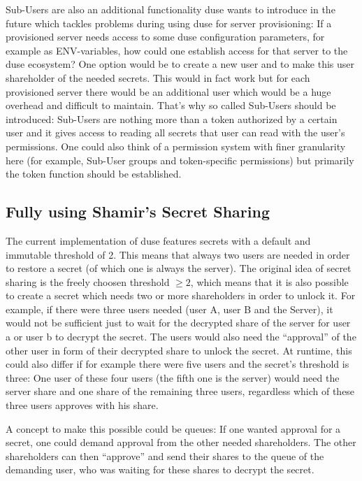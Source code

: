 Sub-Users are also an additional functionality duse wants to introduce in
the future which tackles problems during using duse for server provisioning:
If a provisioned server needs access to some duse configuration parameters,
for example as ENV-variables, how could one establish access for that server
to the duse ecosystem? One option would be to create a new user and to make
this user shareholder of the needed secrets. This would in fact work but for
each provisioned server there would be an additional user which would be a
huge overhead and difficult to maintain. That's why so called Sub-Users should
be introduced: Sub-Users are nothing more than a token authorized by a certain
user and it gives access to reading all secrets that user can read with the
user's permissions. One could also think of a permission system with finer
granularity here (for example, Sub-User groups and token-specific permissions)
but primarily the token function should be established.

\subsection{Fully using Shamir's Secret Sharing}

The current implementation of duse features secrets with a default and 
immutable threshold of 2. This means that always two users are needed in
order to restore a secret (of which one is always the server). The original
idea of secret sharing is the freely choosen threshold $\geq 2$, which
means that it is also possible to create a secret which needs two or more
shareholders in order to unlock it. For example, if there were three users
needed (user A, user B and the Server), it would not be sufficient just to
wait for the decrypted share of the server for user a or user b to decrypt
the secret. The users would also need the ``approval'' of the other user
in form of their decrypted share to unlock the secret. At runtime, this could
also differ if for example there were five users and the secret's threshold
is three: One user of these four users (the fifth one is the server) would
need the server share and one share of the remaining three users, regardless
which of these three users approves with his share.

A concept to make this possible could be queues: If one wanted
approval for a secret, one could demand approval from the other needed
shareholders. The other shareholders can then ``approve'' and send their
shares to the queue of the demanding user, who was waiting for these shares
to decrypt the secret.

